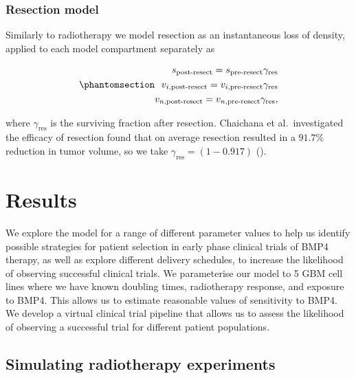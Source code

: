 \documentclass[
  letterpaper,
]{scrreprt}
\theoremstyle{definition}
\theoremstyle{remark}
\begin{document}
\subsubsection{Resection model}\label{sec-resection-model}

Similarly to radiotherapy we model resection as an instantaneous loss of
density, applied to each model compartment separately as

\begin{equation}\phantomsection\label{eq-resection_model}{
  \begin{aligned}
    s_\text{post-resect} = s_\text{pre-resect} \gamma_\text{res} \\ 
    v_{i,\text{post-resect}} = v_{i,\text{pre-resect}} \gamma_\text{res} \\ 
    v_{n,\text{post-resect}} = v_{n,\text{pre-resect}} \gamma_\text{res},
  \end{aligned} 
}\end{equation}

where \(\gamma_{\text{res}}\) is the surviving fraction after resection.
Chaichana et al.~investigated the efficacy of resection found that on
average resection resulted in a \(91.7 \%\) reduction in tumor volume,
so we take \(\gamma_{\text{res}} = (1- 0.917)\)
().

\section{Results}\label{sec-results}

We explore the model for a range of different parameter values to help
us identify possible strategies for patient selection in early phase
clinical trials of BMP4 therapy, as well as explore different delivery
schedules, to increase the likelihood of observing successful clinical
trials. We parameterise our model to 5 GBM cell lines where we have
known doubling times, radiotherapy response, and exposure to BMP4. This
allows us to estimate reasonable values of sensitivity to BMP4. We
develop a virtual clinical trial pipeline that allows us to assess the
likelihood of observing a successful trial for different patient
populations.

\subsection{Simulating radiotherapy
experiments}\label{sec-simulating-RT-experiments}
\end{document}
